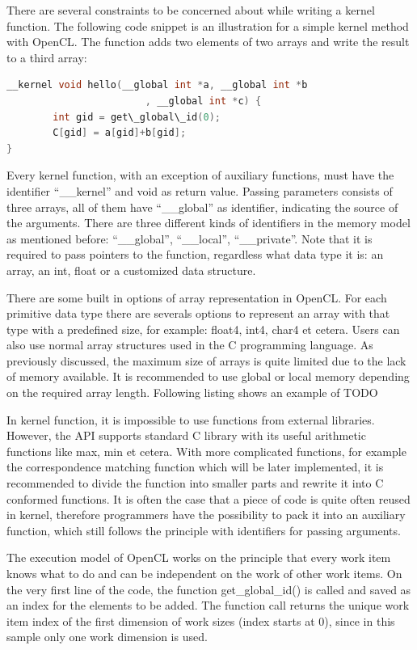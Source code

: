 There are several constraints to be concerned about while writing a kernel function. The following code snippet is an illustration for a simple kernel method with OpenCL. The function adds two elements of two arrays and write the result to a third array:
\begin{lstlisting}[language=C]
__kernel void hello(__global int *a, __global int *b
						, __global int *c) {
        int gid = get\_global\_id(0);
        C[gid] = a[gid]+b[gid];
}

\end{lstlisting}

Every kernel function, with an exception of auxiliary functions, must have the identifier “\_\_kernel” and void as return value. Passing parameters consists of three arrays, all of them have “\_\_global” as identifier, indicating the source of the arguments. There are three different kinds of identifiers in the memory model as mentioned before: “\_\_global”, “\_\_local”, “\_\_private”. Note that it is required to pass pointers to the function, regardless what data type it is: an array, an int, float or a customized data structure.

There are some built in options of array representation in OpenCL. For each primitive data type there are severals options to represent an array with that type with a predefined size, for example: float4, int4, char4 et cetera. Users can also use normal array structures used in the C programming language.  As previously discussed, the maximum size of arrays is quite limited due to the lack of memory available. It is recommended to use global or local memory depending on the required array length. Following listing shows an example of TODO

In kernel function, it is impossible to use functions from external libraries. However, the API supports standard C library with its useful arithmetic functions like max, min et cetera. With more complicated functions, for example the correspondence matching function which will be later implemented, it is recommended to divide the function into smaller parts and rewrite it into C conformed functions. It is often the case that a piece of code is quite often reused in kernel, therefore programmers have the possibility to pack it into an auxiliary function, which still follows the principle with identifiers for passing arguments.

The execution model of OpenCL works on the principle that every work item knows what to do and can be independent on the work of other work items. On the very first line of the code, the function get\_global\_id() is called and saved as an index for the elements to be added. The function call returns the unique work item index of the first dimension of work sizes (index starts at 0), since in this sample only one work dimension is used.

